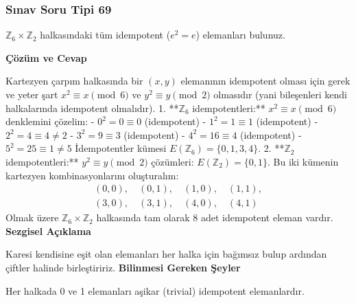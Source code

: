 \documentclass[11pt, a4paper]{article}
\newenvironment{cozum}{
    \vspace{0.5cm}
    \noindent\textcolor{green!60!black}{\faCheckCircle\enspace \textbf{\Large Çözüm ve Cevap}}\par\vspace{0.2cm}
}{}
\newenvironment{sezgisel}{
    \vspace{0.5cm}
    \noindent\textcolor{orange!80!black}{\faLightbulb\enspace \textbf{\Large Sezgisel Açıklama}}\par\vspace{0.2cm}
    \itshape
}{}
\newenvironment{bilgi}{
    \vspace{0.5cm}
    \noindent\textcolor{red!70!black}{\faExclamationTriangle\enspace \textbf{\Large Bilinmesi Gereken Şeyler}}\par\vspace{0.2cm}
}{}
\begin{document}
\newpage
\subsubsection{Sınav Soru Tipi 69}
\begin{sinavbox}
$\mathbb{Z}_{6} \times \mathbb{Z}_{2}$ halkasındaki tüm idempotent ($e^2 = e$) elemanları bulunuz.
\end{sinavbox}
\begin{cozum}
Kartezyen çarpım halkasında bir $(x, y)$ elemanının idempotent olması için gerek ve yeter şart $x^2 \equiv x \pmod 6$ ve $y^2 \equiv y \pmod 2$ olmasıdır (yani bileşenleri kendi halkalarında idempotent olmalıdır).
1. **$\mathbb{Z}_6$ idempotentleri:**
   $x^2 \equiv x \pmod 6$ denklemini çözelim:
   - $0^2 = 0 \equiv 0$ (idempotent)
   - $1^2 = 1 \equiv 1$ (idempotent)
   - $2^2 = 4 \equiv 4 \neq 2$
   - $3^2 = 9 \equiv 3$ (idempotent)
   - $4^2 = 16 \equiv 4$ (idempotent)
   - $5^2 = 25 \equiv 1 \neq 5$
   İdempotentler kümesi $E(\mathbb{Z}_6) = \{0, 1, 3, 4\}$.
2. **$\mathbb{Z}_2$ idempotentleri:**
   $y^2 \equiv y \pmod 2$ çözümleri: $E(\mathbb{Z}_2) = \{0, 1\}$.
Bu iki kümenin kartezyen kombinasyonlarını oluşturalım:
\begin{align*}
(0, 0), \quad (0, 1), \quad (1, 0), \quad (1, 1), \\
(3, 0), \quad (3, 1), \quad (4, 0), \quad (4, 1)
\end{align*}
Olmak üzere $\mathbb{Z}_6 \times \mathbb{Z}_2$ halkasında tam olarak 8 adet idempotent eleman vardır.
\end{cozum}
\begin{sezgisel}
Karesi kendisine eşit olan elemanları her halka için bağımsız bulup ardından çiftler halinde birleştiririz.
\end{sezgisel}
\begin{bilgi}
Her halkada 0 ve 1 elemanları aşikar (trivial) idempotent elemanlardır.
\end{bilgi}

\newpage
\end{document}
